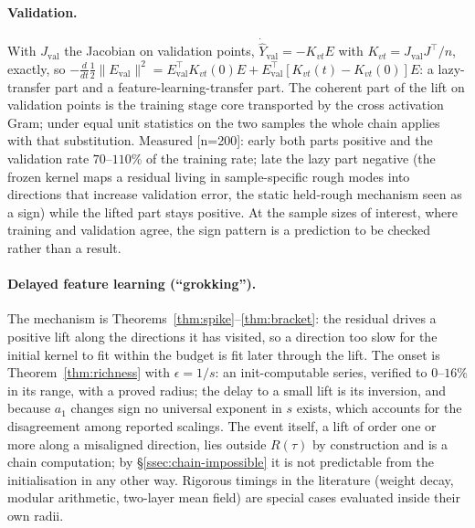 \paragraph{Validation.} With $J_{\mathrm{val}}$ the Jacobian on validation
points, $\dot{\hat Y}_{\mathrm{val}}=-K_{vt}E$ with
$K_{vt}=J_{\mathrm{val}}J^{\!\top}/n$, exactly, so
$-\frac d{dt}\frac12\|E_{\mathrm{val}}\|^2=E_{\mathrm{val}}^{\!\top}K_{vt}(0)E+
E_{\mathrm{val}}^{\!\top}[K_{vt}(t)-K_{vt}(0)]E$: a lazy-transfer part and a
feature-learning-transfer part. The coherent part of the lift on validation
points is the training stage core transported by the cross activation Gram;
under equal unit statistics on the two samples the whole chain applies with
that substitution. Measured [n=200]: early both parts positive and the
validation rate $70$--$110\%$ of the training rate; late the lazy part
negative (the frozen kernel maps a residual living in sample-specific rough
modes into directions that increase validation error, the static held-rough
mechanism seen as a sign) while the lifted part stays positive. At the sample
sizes of interest, where training and validation agree, the sign pattern is a
prediction to be checked rather than a result.

\paragraph{Delayed feature learning (``grokking'').} The mechanism is
Theorems~\ref{thm:spike}--\ref{thm:bracket}: the residual drives a positive
lift along the directions it has visited, so a direction too slow for the
initial kernel to fit within the budget is fit later through the lift. The
onset is Theorem~\ref{thm:richness} with $\epsilon=1/s$: an init-computable
series, verified to $0$--$16\%$ in its range, with a proved radius; the delay
to a small lift is its inversion, and because $a_1$ changes sign no universal
exponent in $s$ exists, which accounts for the disagreement among reported
scalings. The event itself, a lift of order one or more along a misaligned
direction, lies outside $R(\tau)$ by construction and is a chain computation;
by \S\ref{ssec:chain-impossible} it is not predictable from the
initialisation in any other way. Rigorous timings in the literature (weight
decay, modular arithmetic, two-layer mean field) are special cases evaluated
inside their own radii.

